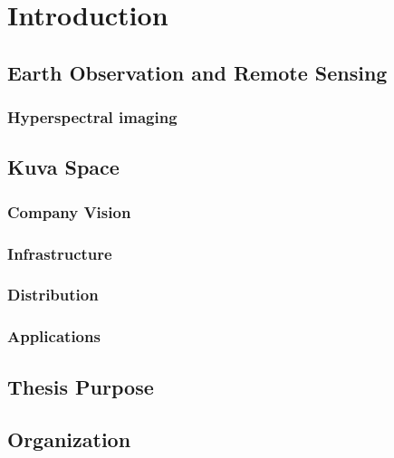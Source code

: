 \chapter{Introduction}


\section{Earth Observation and Remote Sensing}

\subsection{Hyperspectral imaging}

\section{Kuva Space}

\subsection{Company Vision}
\subsection{Infrastructure}
\subsection{Distribution}
\subsection{Applications}

\section{Thesis Purpose}

\section{Organization}

